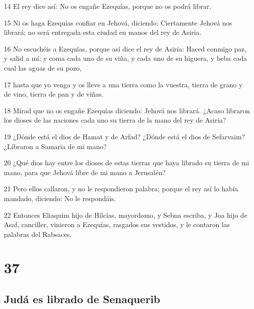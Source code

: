 \par 14 El rey dice así: No os engañe Ezequías, porque no os podrá librar.
\par 15 Ni os haga Ezequías confiar en Jehová, diciendo: Ciertamente Jehová nos librará; no será entregada esta ciudad en manos del rey de Asiria.
\par 16 No escuchéis a Ezequías, porque así dice el rey de Asiria: Haced conmigo paz, y salid a mí; y coma cada uno de su viña, y cada uno de su higuera, y beba cada cual las aguas de su pozo,
\par 17 hasta que yo venga y os lleve a una tierra como la vuestra, tierra de grano y de vino, tierra de pan y de viñas.
\par 18 Mirad que no os engañe Ezequías diciendo: Jehová nos librará. ¿Acaso libraron los dioses de las naciones cada uno su tierra de la mano del rey de Asiria?
\par 19 ¿Dónde está el dios de Hamat y de Arfad? ¿Dónde está el dios de Sefarvaim? ¿Libraron a Samaria de mi mano?
\par 20 ¿Qué dios hay entre los dioses de estas tierras que haya librado su tierra de mi mano, para que Jehová libre de mi mano a Jerusalén?
\par 21 Pero ellos callaron, y no le respondieron palabra; porque el rey así lo había mandado, diciendo: No le respondáis.
\par 22 Entonces Eliaquim hijo de Hilcías, mayordomo, y Sebna escriba, y Joa hijo de Asaf, canciller, vinieron a Ezequías, rasgados sus vestidos, y le contaron las palabras del Rabsaces.

\chapter{37}

\section*{Judá es librado de Senaquerib}

